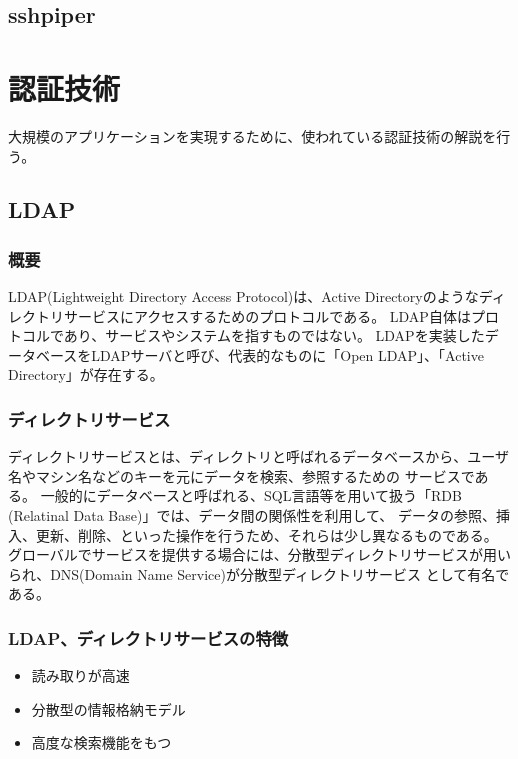 \documentclass[12pt,a4paper,titlepage]{jsarticle}
\begin{document}
\subsection{sshpiper}


\section{認証技術}
大規模のアプリケーションを実現するために、使われている認証技術の解説を行う。
\subsection{LDAP}
\subsubsection*{概要}
LDAP(Lightweight Directory Access Protocol)は、Active Directoryのようなディレクトリサービスにアクセスするためのプロトコルである。
LDAP自体はプロトコルであり、サービスやシステムを指すものではない。
LDAPを実装したデータベースをLDAPサーバと呼び、代表的なものに「Open LDAP」、「Active Directory」が存在する。\par
\subsubsection*{ディレクトリサービス}
ディレクトリサービスとは、ディレクトリと呼ばれるデータベースから、ユーザ名やマシン名などのキーを元にデータを検索、参照するための
サービスである。
一般的にデータベースと呼ばれる、SQL言語等を用いて扱う「RDB (Relatinal Data Base)」では、データ間の関係性を利用して、
データの参照、挿入、更新、削除、といった操作を行うため、それらは少し異なるものである。
グローバルでサービスを提供する場合には、分散型ディレクトリサービスが用いられ、DNS(Domain Name Service)が分散型ディレクトリサービス
として有名である。

\subsubsection*{LDAP、ディレクトリサービスの特徴}

\begin{itemize}
    \item 読み取りが高速
    \item 分散型の情報格納モデル
    \item 高度な検索機能をもつ
\end{itemize}
\end{document}
